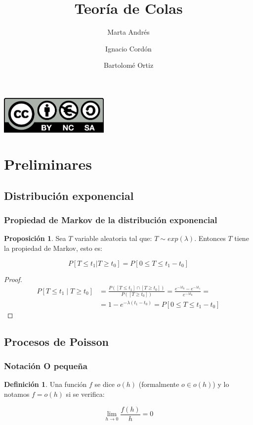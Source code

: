 \documentclass[a4paper,10pt]{scrartcl}
\title{Teoría de Colas}
\author{
  Marta Andrés\and
  Ignacio Cordón\and
  Bartolomé Ortiz\and
}
\date{}
\theoremstyle{definition}
\newtheorem*{mydef}{Definición}
\newtheorem*{fact}{Proposición}
\numberwithin{equation}{section}
\begin{document}
\maketitle

\begin{center}
  \includegraphics[width=0.4\textwidth]{./imgs/by-nc-sa.png}
\end{center}

\tableofcontents
\pagebreak

\section{Preliminares}

\subsection{Distribución exponencial}
\subsubsection{Propiedad de Markov de la distribución exponencial}


\begin{fact}
 Sea $T$ variable aleatoria tal que: $T \sim exp(\lambda)$. Entonces $T$ tiene la propiedad de Markov, esto es:
 
 \[P[T \le t_1 | T \ge t_0] = P[0\le T \le t_1 - t_0] \]
\end{fact}

\begin{proof}
 \begin{align*}
 P[T \le t_1 \mid T\ge t_0] & =  \frac{P([T\le t_1] \cap [T\ge t_0])}{P([T\ge t_0])} = \frac{e^{-\lambda t_0} - e^{-\lambda t_1}}{e^{-\lambda t_0}} = \\
                            & =  1 - e^{-\lambda(t_1 - t_0)} = P[0\le T \le t_1-t_0]
 \end{align*}
\end{proof}


\subsection{Procesos de Poisson}

\subsubsection{Notación O pequeña}
  \begin{mydef} 
  Una función $f$ se dice $o(h)$ (formalmente $o\in o(h)$) y lo notamos $f=o(h)$ si se verifica:
  
  \[\lim_{h\rightarrow 0} \frac{f(h)}{h} = 0\]
  \end{mydef}
\end{document}
